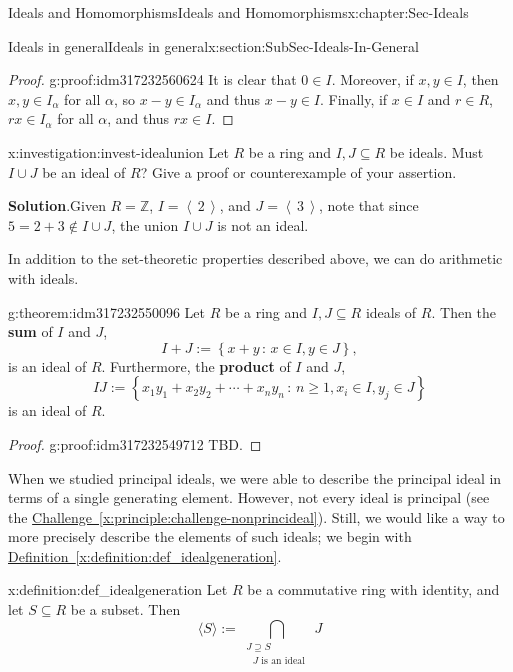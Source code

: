 \documentclass[oneside,10pt,]{book}
\newcommand{\blocktitlefont}{\relax}
\newcommand{\xreffont}{\relax}
\newcommand{\terminology}[1]{\textbf{#1}}
\numberwithin{equation}{section}
\renewcommand{\ge}{\geqslant}
\newcommand{\ideal}[1]{\left\langle\, #1 \,\right\rangle}
\newcommand{\setof}[2]{{\left\{#1\,\colon\,#2\right\}}}
\def\Z{{\mathbb Z}}
\begin{document}
\begin{chapterptx}{Ideals and Homomorphisms}{}{Ideals and Homomorphisms}{}{}{x:chapter:Sec-Ideals}
\begin{sectionptx}{Ideals in general}{}{Ideals in general}{}{}{x:section:SubSec-Ideals-In-General}
\begin{proof}{}{g:proof:idm317232560624}
It is clear that \(0\in I\). Moreover, if \(x,y\in I\), then \(x,y\in I_\alpha\) for all \(\alpha\), so \(x-y\in I_\alpha\) and thus \(x-y\in I\). Finally, if \(x\in I\) and \(r\in R\), \(rx\in I_\alpha\) for all \(\alpha\), and thus \(rx\in I\).%
\end{proof}
\begin{investigation}{}{x:investigation:invest-idealunion}%
Let \(R\) be a ring and \(I,J\subseteq R\) be ideals. Must \(I\cup J\) be an ideal of \(R\)? Give a proof or counterexample of your assertion.%
\par\smallskip%
\noindent\textbf{\blocktitlefont Solution}.\hypertarget{g:solution:idm317232552960}{}\quad{}Given \(R = \Z\), \(I = \ideal{2}\), and \(J = \ideal{3}\), note that since \(5 = 2 + 3\notin I\cup J\), the union \(I\cup J\) is not an ideal.%
\end{investigation}
In addition to the set-theoretic properties described above, we can do arithmetic with ideals.%
\begin{theorem}{}{}{g:theorem:idm317232550096}%
Let \(R\) be a ring and \(I,J\subseteq R\) ideals of \(R\). Then the \terminology{sum} of \(I\) and \(J\),%
\begin{equation*}
I+J := \setof{x+y}{x\in I, y\in J},
\end{equation*}
is an ideal of \(R\). Furthermore, the \terminology{product} of \(I\) and \(J\),%
\begin{equation*}
IJ := \setof{x_1 y_1 + x_2 y_2 + \cdots + x_n y_n}{n\ge 1, x_i \in I, y_j\in J}
\end{equation*}
is an ideal of \(R\).%
\end{theorem}
\begin{proof}{}{g:proof:idm317232549712}
TBD.\end{proof}
When we studied principal ideals, we were able to describe the principal ideal in terms of a single generating element. However, not every ideal is principal (see the \hyperref[x:principle:challenge-nonprincideal]{Challenge~{\xreffont\ref{x:principle:challenge-nonprincideal}}}). Still, we would like a way to more precisely describe the elements of such ideals; we begin with \hyperref[x:definition:def_idealgeneration]{Definition~{\xreffont\ref{x:definition:def_idealgeneration}}}.%
\begin{definition}{}{x:definition:def_idealgeneration}%
Let \(R\) be a commutative ring with identity, and let \(S\subseteq R\) be a subset. Then%
\begin{equation}
\langle S \rangle := \bigcap\limits_{\substack{J\supseteq S\\\text{ \(J\) is an ideal } } } J\label{x:men:eq_idealgeneratedbyset}

\end{equation}
\end{definition}
\end{sectionptx}
\end{chapterptx}
\end{document}

